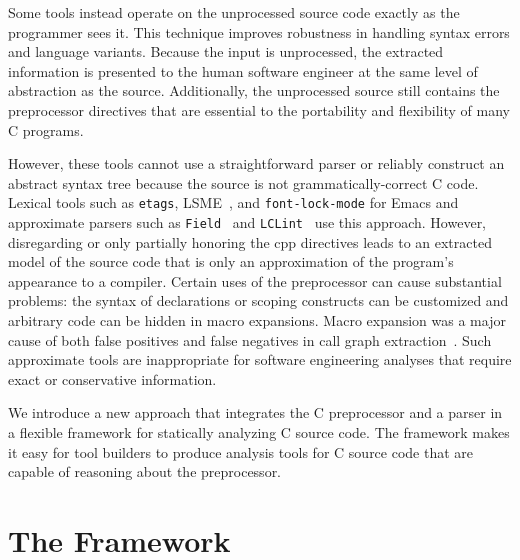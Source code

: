 \documentclass{article}
\newcommand{\pcp}{\mbox{\textsf{PCp}$^3$}}
\newcommand{\Cpp}{\mbox{\textsf{cpp}}}
\newcommand{\C}{\mbox{C}}
\begin{document}
Some tools instead operate on the
unprocessed source code exactly as the programmer sees it.  This
technique improves robustness in handling syntax errors
and language variants. Because the input is unprocessed, the extracted
information is presented to the human software engineer at the same
level of abstraction as the source.  Additionally, the unprocessed
source still contains the preprocessor directives that are essential
to the portability and flexibility of many \C{} programs.

However, these tools cannot use a straightforward parser or reliably construct an
abstract syntax tree because the source is not
grammatically-correct \C{} code.  Lexical tools such as \texttt{etags},
LSME~\cite{Murphy96}, and \texttt{font-lock-mode} for Emacs and
approximate parsers such as \texttt{Field}~\cite{ReissField} and
\texttt{LCLint}~\cite{LCLint} use this approach.  However,
disregarding or only partially honoring the \Cpp{} directives leads to
an extracted model of the source code that is only an approximation of
the program's appearance to a compiler.  Certain uses of the
preprocessor can cause substantial problems:  the syntax of declarations 
or scoping constructs can be customized and arbitrary code can be hidden in macro
expansions.  Macro expansion was a
major cause of both false positives and false negatives in call graph
extraction~\cite{Griswold96}.  Such approximate tools are inappropriate
for software engineering analyses that require exact or conservative
information.

We introduce a new approach that integrates the \C{} preprocessor and a
parser in a flexible framework for statically analyzing \C{}
source code.  The framework makes it easy for tool builders to produce
analysis tools for \C{} source code that are capable of reasoning about the
preprocessor.



\section{The Framework}
\label{sec:framework}
\end{document}
